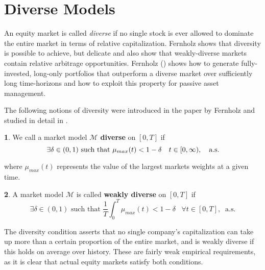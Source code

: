 \documentclass[british]{amsart} \usepackage{lmodern}
\numberwithin{equation}{section} \numberwithin{figure}{section}
\theoremstyle{plain} \newtheorem{thm}{\protect\theoremname}[section]
\theoremstyle{definition} \newtheorem{defn}[thm]{\protect\definitionname}
\theoremstyle{plain} \newtheorem{assumption}[thm]{\protect\assumptionname}
\theoremstyle{plain} \newtheorem{lem}[thm]{\protect\lemmaname}
\theoremstyle{plain} \newtheorem{prop}[thm]{\protect\propositionname}
\theoremstyle{remark} \newtheorem{rem}[thm]{\protect\remarkname}
\theoremstyle{plain} \newtheorem{cor}[thm]{\protect\corollaryname}
\begin{document}
\newpage
\section{Diverse Models}

An equity market is called \textit{diverse}
if no single stock is ever allowed to dominate the entire market in
terms of relative capitalization. Fernholz \cite{fernholz2005relative} shows
that diversity is possible to achieve, but delicate and also show
that weakly-diverse markets contain relative arbitrage opportunities.
Fernholz (\cite{fernholz2002}) shows how to generate fully-invested,
long-only portfolios that outperform a diverse market over sufficiently
long time-horizons and how to exploit this property for passive asset
management.

The following notions of diversity were introduced in the paper by
Fernholz \cite{fernholz1999diversity} and studied in detail in
\cite{fernholz2002}.

\begin{defn}
  \label{def:defnD}We call a market model \textbf{$\mathcal{M}$ diverse
  }on $[0,T]$ if 
  \begin{equation}
    \exists\delta\in(0,1)\text{ such that }
      \mu_{max}(t)<1-\delta
    \quad t\in[0,\infty),
    \quad \text{a.s.}
  \end{equation}

  where $\mu_{max}(t)$ represents the value of the largest markets
  weights at a given time. 
\end{defn}

\begin{defn}
  A market model\textbf{ $\mathcal{M}$} is called \textbf{weakly diverse}
  on $[0,T]$ if 
  \begin{equation}
    \exists\delta\in(0,1)\text{ such that }\frac{1}{T}\int_{0}^{T}\mu_{max}(t)<1-\delta\;\;\;\forall t\in[0,T],\;\;\text{a.s.}
  \end{equation}
\end{defn}

The diversity condition asserts that no single company's
capitalization can take up more than a certain proportion of the entire
market, and is weakly diverse if this holds on average over history.
These are fairly weak empirical requirements, as it is clear that
actual equity markets satisfy both conditions.
\end{document}
